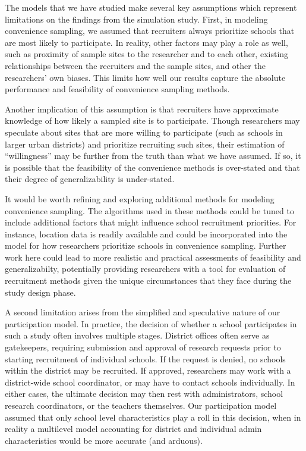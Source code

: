 \documentclass[english,man,floatsintext]{apa6}
\begin{document}
The models that we have studied make several key assumptions which represent limitations on the findings from the simulation study. First, in modeling convenience sampling, we assumed that recruiters always prioritize schools that are most likely to participate. In reality, other factors may play a role as well, such as proximity of sample sites to the researcher and to each other, existing relationships between the recruiters and the sample sites, and other the researchers' own biases.  This limits how well our results capture the absolute performance and feasibility of convenience sampling methods.

Another implication of this assumption is that recruiters have approximate knowledge of how likely a sampled site is to participate. Though researchers may speculate about sites that are more willing to participate (such as schools in larger urban districts) and prioritize recruiting such sites, their estimation of \enquote{willingness} may be further from the truth than what we have assumed. If so, it is possible that the feasibility of the convenience methods is over-stated and that their degree of generalizability is under-stated.

It would be worth refining and exploring additional methods for modeling convenience sampling. The algorithms used in these methods could be tuned to include additional factors that might influence school recruitment priorities. For instance, location data is readily available and could be incorporated into the model for how researchers prioritize schools in convenience sampling. Further work here could lead to more realistic and practical assessments of feasibility and generalizabilty, potentially providing researchers with a tool for evaluation of recruitment methods given the unique circumstances that they face during the study design phase.

A second limitation arises from the simplified and speculative nature of our participation model. In practice, the decision of whether a school participates in such a study often involves multiple stages. District offices often serve as gatekeepers, requiring submission and approval of research requests prior to starting recruitment of individual schools. If the request is denied, no schools within the district may be recruited. If approved, researchers may work with a district-wide school coordinator, or may have to contact schools individually. In either cases, the ultimate decision may then rest with administrators, school research coordinators, or the teachers themselves. Our participation model assumed that only school level characteristics play a roll in this decision, when in reality a multilevel model accounting for district and individual admin characteristics would be more accurate (and arduous).
\end{document}
